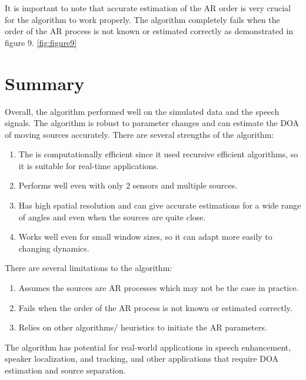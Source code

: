 \documentclass{article}
\begin{document}
It is important to note that accurate estimation of the AR order is very crucial for the algorithm to work properly.
The algorithm completely fails when the order of the AR process is not known or estimated correctly as demonstrated in figure 9.
\ref*{fig:figure9}


\section{Summary}
Overall, the algorithm performed well on the simulated data and the speech signals. The algorithm is robust to parameter changes and can estimate the DOA of moving sources accurately.
There are several strengths of the algorithm:

\begin{enumerate}
    \item The is computationally efficient since it used recursive efficient algorithms, so it is suitable for real-time applications.
    \item Performs well even with only 2 sensors and multiple sources.
    \item Has high spatial resolution and can give accurate estimations for a wide range of angles and even when the sources are quite close.
    \item Works well even for small window sizes, so it can adapt more easily to changing dynamics.
\end{enumerate}    

There are several limitations to the algorithm:
\begin{enumerate}
    \item Assumes the sources are AR processes which may not be the case in practice.
    \item Fails when the order of the AR process is not known or estimated correctly.
    \item Relies on other algorithms/ heuristics to initiate the AR parameters.
\end{enumerate}

The algorithm has potential for real-world applications in speech enhancement, speaker localization, and tracking, and other applications that require DOA estimation and source separation.



\end{document}
